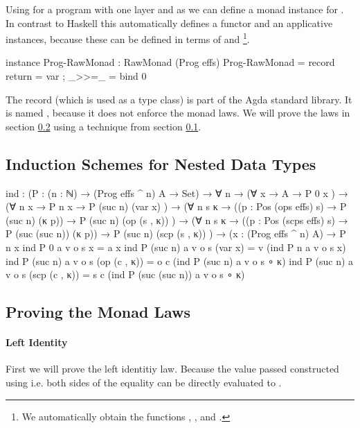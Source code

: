 Using \bind{} for a program with one layer and  as
 we can define a monad instance for
\AgdaSpace{}.
In contrast to Haskell this automatically defines a functor and an applicative
instances, because these can be defined in terms of \bind{} and
\footnote{We automatically obtain the functions
  \AgdaFunction{<\$>}, \AgdaFunction{<*>},  and
  \AgdaFunction{>>}. }.
\begin{code}
instance
  Prog-RawMonad : RawMonad (Prog effs)
  Prog-RawMonad = record { return = var ; _>>=_ = bind 0 }
\end{code}
The record (which is used as a type class) is part of the Agda standard library.
It is named , because it does not enforce the monad laws.
We will prove the laws in section \ref{subsec:scoped-algebra:monad-laws} using
a technique from section \ref{subsec:scoped-algebra:ind}.


\subsection{Induction Schemes for Nested Data Types}
\label{subsec:scoped-algebra:ind}

\begin{code}
ind : (P : (n : ℕ) → (Prog effs ^ n) A → Set) → ∀ n →
  (∀ {x}        → A                                                    → P 0 x                     )  →
  (∀ {n x}      → P n x                                                → P (suc n) (var x)         )  →
  (∀ {n} s {κ}  → ((p : Pos (ops   effs) s) → P (suc n)        (κ p))  → P (suc n) (op   (s , κ))  )  →
  (∀ {n} s {κ}  → ((p : Pos (scps  effs) s) → P (suc (suc n))  (κ p))  → P (suc n) (scp  (s , κ))  )  →
  (x : (Prog effs ^ n) A) → P n x
ind P 0       a v o s x               = a x
ind P (suc n) a v o s (var x)         = v    (ind P n              a v o s x)
ind P (suc n) a v o s (op   (c , κ))  = o c  (ind P (suc n)        a v o s ∘ κ)
ind P (suc n) a v o s (scp  (c , κ))  = s c  (ind P (suc (suc n))  a v o s ∘ κ)
\end{code}


\subsection{Proving the Monad Laws}
\label{subsec:scoped-algebra:monad-laws}

\paragraph{Left Identity}
First we will prove the left identitiy law.
Because the value passed \AgdaFunction{>>=} constructed using
 i.e.  both sides of the
equality can be directly evaluated to
\AgdaSpace{}.

